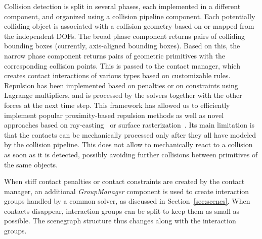 Collision detection is split in several phases, each implemented in a different component, and organized using a collision pipeline component.
Each potentially colliding object is associated with a collision geometry based on or mapped from the independent DOFs.
The broad phase component returns pairs of colliding bounding boxes (currently, axis-aligned bounding boxes).
Based on this, the narrow phase component returns pairs of geometric primitives with the corresponding collision points.
This is passed to the contact manager, which creates contact interactions of various types based on customizable rules.
Repulsion has been implemented based on penalties or on constraints using Lagrange multipliers, and is processed by the solvers together with the other forces at the next time step.
This framework has allowed us to efficiently implement popular proximity-based repulsion methods as well as novel approaches based on ray-casting~\cite{HerFauRaf08} or surface rasterization~\cite{FauBarAllFal08,AFCFDK10}.
Its main limitation is that the contacts can be mechanically processed only after they all have modeled by the collision pipeline.
This does not allow to mechanically react to a collision as soon as it is detected, possibly avoiding further collisions between primitives of the same objects.

When stiff contact penalties or contact constraints are created by the contact manager, an additional \textit{GroupManager} component is used to create interaction groups handled by a common solver, as discussed in Section~\ref{sec:scenes}. 
When contacts disappear, interaction groups can be split to keep them as small as possible.
The scenegraph structure thus changes along with the interaction groups.


